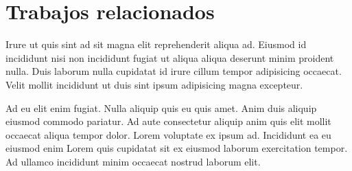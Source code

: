 \section{Trabajos relacionados}
Irure ut quis sint ad sit magna elit reprehenderit aliqua ad. Eiusmod id incididunt nisi non incididunt fugiat ut aliqua aliqua deserunt minim proident nulla. Duis laborum nulla cupidatat id irure cillum tempor adipisicing occaecat. Velit mollit incididunt ut duis sint ipsum adipisicing magna excepteur.

Ad eu elit enim fugiat. Nulla aliquip quis eu quis amet. Anim duis aliquip eiusmod commodo pariatur. Ad aute consectetur aliquip anim quis elit mollit occaecat aliqua tempor dolor. Lorem voluptate ex ipsum ad. Incididunt ea eu eiusmod enim Lorem quis cupidatat sit ex eiusmod laborum exercitation tempor. Ad ullamco incididunt minim occaecat nostrud laborum elit.